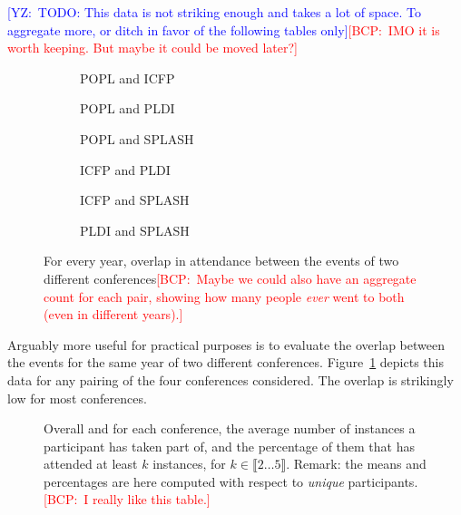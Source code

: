 \documentclass[manuscript, review, screen]{acmart}
\newcommand{\yz}[1]{\textcolor{blue}{{[YZ:~#1]}}}
\newcommand{\bcp}[1]{\textcolor{red}{{[BCP:~#1]}}}
\newcommand{\yz}[1]{}
\newcommand{\bcp}[1]{}
\begin{document}
\yz{TODO: This data is not striking enough and takes a lot of space. To aggregate
  more, or ditch in favor of the following tables only}\bcp{IMO it is worth
  keeping.  But maybe it could be moved later?}

\begin{figure}
  \centering
  \begin{subfigure}[b]{0.3\textwidth}
    \centering
    \caption{POPL and ICFP}
  \end{subfigure}
  \begin{subfigure}[b]{0.3\textwidth}
    \centering
    \caption{POPL and PLDI}
  \end{subfigure}
  \begin{subfigure}[b]{0.3\textwidth}
    \centering
    \caption{POPL and SPLASH}
  \end{subfigure}
  \begin{subfigure}[b]{0.3\textwidth}
    \centering
    \caption{ICFP and PLDI}
  \end{subfigure}
  \begin{subfigure}[b]{0.3\textwidth}
    \centering
    \caption{ICFP and SPLASH}
  \end{subfigure}
  \begin{subfigure}[b]{0.3\textwidth}
    \centering
    \caption{PLDI and SPLASH}
  \end{subfigure}
   \caption{For every year, overlap in attendance between the events of two
     different conferences\bcp{Maybe we could also have an aggregate count
       for each pair, showing how many people {\em ever} went to both (even
       in different years).}}
  \label{fig:overlap-cross}
\end{figure}

Arguably more useful for practical purposes is to evaluate the overlap 
between the events for the same year of two different conferences.
Figure~\ref{fig:overlap-cross} depicts this data for any pairing of the four
conferences considered. The overlap is strikingly low for most conferences.

\begin{figure}
\caption{Overall and for each conference, the average number of instances a
  participant has taken part of, and the percentage of them that has
  attended at least $k$ instances, for $k\in\llbracket 2 \dots 5
  \rrbracket$. Remark: the means and percentages are here computed with
  respect to \emph{unique} participants.  \bcp{I really like this table.}}
\label{fig:reccurent}
\end{figure}
\end{document}
